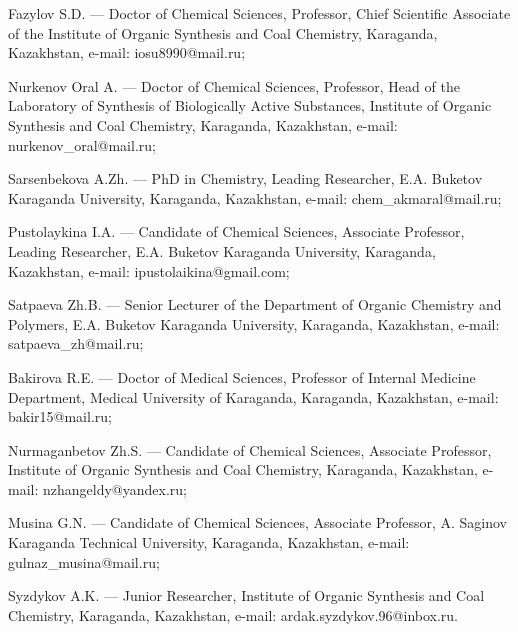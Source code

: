 \begin{authorinfo}
Fazylov S.D. — Doctor of Chemical Sciences, Professor, Chief
Scientific Associate of the Institute of Organic Synthesis and Coal
Chemistry, Karaganda, Kazakhstan, e-mail: iosu8990@mail.ru;

Nurkenov Oral A. — Doctor of Chemical Sciences, Professor, Head of the
Laboratory of Synthesis of Biologically Active Substances, Institute
of Organic Synthesis and Coal Chemistry, Karaganda, Kazakhstan,
e-mail: nurkenov\_oral@mail.ru;

Sarsenbekova A.Zh. — PhD in Chemistry, Leading Researcher,
E.A. Buketov Karaganda University, Karaganda, Kazakhstan, e-mail:
chem\_akmaral@mail.ru;

Pustolaykina I.A. — Candidate of Chemical Sciences, Associate
Professor, Leading Researcher, E.A. Buketov Karaganda University,
Karaganda, Kazakhstan, e-mail: ipustolaikina@gmail.com;

Satpaeva Zh.B. — Senior Lecturer of the Department of Organic
Chemistry and Polymers, E.A. Buketov Karaganda University, Karaganda,
Kazakhstan, e-mail: satpaeva\_zh@mail.ru;

Bakirova R.E. — Doctor of Medical Sciences, Professor of Internal
Medicine Department, Medical University of Karaganda, Karaganda,
Kazakhstan, e-mail: bakir15@mail.ru;

Nurmaganbetov Zh.S. — Candidate of Chemical Sciences, Associate
Professor, Institute of Organic Synthesis and Coal Chemistry,
Karaganda, Kazakhstan, e-mail: nzhangeldy@yandex.ru;

Musina G.N. — Candidate of Chemical Sciences, Associate Professor,
A. Saginov Karaganda Technical University, Karaganda, Kazakhstan,
e-mail: gulnaz\_musina@mail.ru;

Syzdykov A.K. — Junior Researcher, Institute of Organic Synthesis and
Coal Chemistry, Karaganda, Kazakhstan, e-mail:
ardak.syzdykov.96@inbox.ru.
\end{authorinfo}

